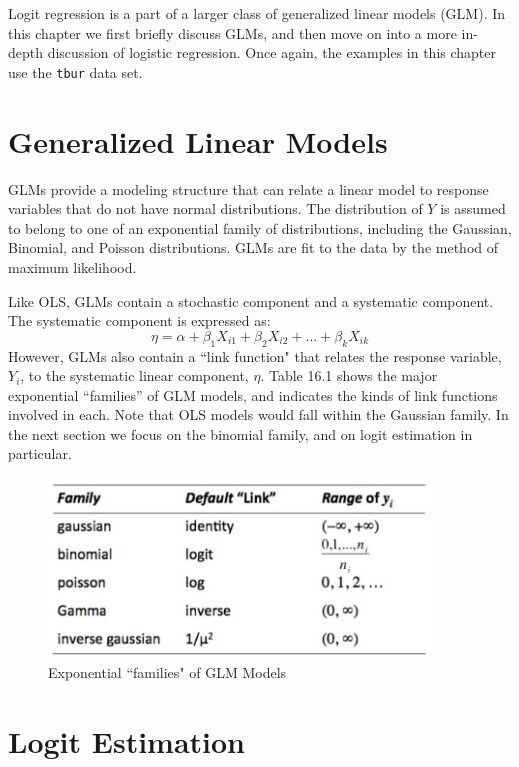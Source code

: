\documentclass[11pt,openany]{book}\usepackage[]{graphicx}\usepackage[]{color}
\begin{document}
Logit regression is a part of a larger class of generalized linear models (GLM).   In this chapter we first briefly discuss GLMs, and then move on into a more in-depth discussion of logistic regression. Once again, the examples in this chapter use the \texttt{tbur} data set. 

\section{Generalized Linear Models} 

GLMs provide a modeling structure that can relate a linear model to response variables that do not have normal distributions. The distribution of $Y$ is assumed to belong to one of an exponential family of distributions, including the Gaussian, Binomial, and Poisson distributions.  GLMs are fit to the data by the method of maximum likelihood. 

Like OLS, GLMs contain a stochastic component and a systematic component. The systematic component is expressed as: 
\begin{equation}
  \eta = \alpha + \beta_1 X_{i1} + \beta_2 X_{i2} + \ldots + \beta_k X_{ik}
\end{equation}
However, GLMs also contain a ``link function" that relates the response variable, $Y_i$, to the systematic linear component, $\eta$.  Table 16.1 shows the major exponential “families” of GLM models, and indicates the kinds of link functions involved in each.  Note that OLS models would fall within the Gaussian family.  In the next section we focus on the binomial family, and on logit estimation in particular.

\begin{figure}
        \centering
        \includegraphics[width=4in]{16_Logit/families.jpg}%
        \caption{Exponential ``families" of GLM Models}
\end{figure} 
 

\section{Logit Estimation} 
\end{document}
